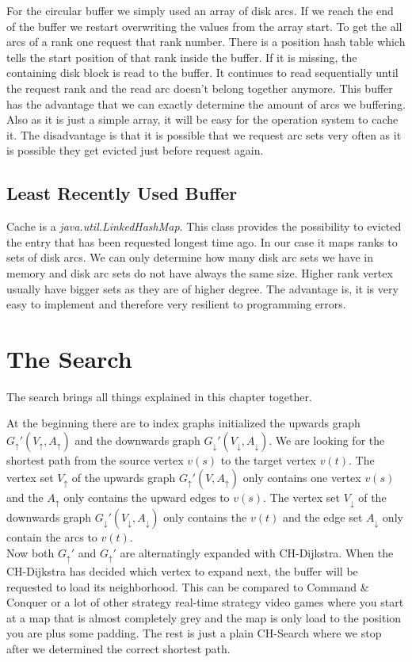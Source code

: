 For the circular buffer we simply used an array of disk arcs. If we reach the end of the buffer we restart overwriting the values from the array start. To get the all arcs of a rank one request that rank number. There is a position hash table which tells the start position of that rank inside the buffer. If it is missing, the containing disk block is read to the buffer. It 
continues to read sequentially until the request rank and the read arc doesn't belong together anymore. This buffer has the advantage that we can exactly determine the amount of arcs we buffering. Also as it is just a simple array, it will be easy for the operation system to cache it.
The disadvantage is that it is possible that we request arc sets very often as it is possible they get evicted just before request again.

\subsection{Least Recently Used Buffer}

Cache is a \textit{java.util.LinkedHashMap}. This class provides the possibility to evicted the entry that has been requested longest time ago. In our case it maps ranks to sets of disk arcs. We can only determine how many 
disk arc sets we have in memory and disk arc sets do not have always the same size. Higher rank vertex usually have bigger sets as they are of higher degree. The advantage is, it is very easy to implement and therefore very 
resilient to programming errors.

\section{The Search}

The search brings all things explained in this chapter together. 

At the beginning there are to index graphs initialized the upwards graph $G_\uparrow'(V_\uparrow, A_\uparrow)$ and the downwards graph $G_\downarrow'(V_\downarrow, A_\downarrow)$. We are looking for the shortest
path from the source vertex $v(s)$ to the target vertex $v(t)$. The vertex set $V_\uparrow$ of the upwards graph $G_\uparrow'(V, A_\uparrow)$ only contains one vertex $v(s)$ and the $A_\uparrow$ only contains 
the upward edges to $v(s)$. The vertex set $V_\downarrow$ of the downwards graph $G_\downarrow'(V_\downarrow, A_\downarrow)$ only contains the $v(t)$ and the edge set $A_\downarrow$ only contain the arcs to $v(t)$.
\\
Now both $G_\uparrow'$ and $G_\uparrow'$ are alternatingly expanded with CH-Dijkstra. When the CH-Dijkstra has decided which vertex to expand next, the buffer will be requested to load its neighborhood. This can be 
compared to Command \& Conquer or a lot of other strategy  real-time strategy video games where you start at a map that is almost completely grey and the map is only load to the position you are plus some padding.
The rest is just a plain CH-Search where we stop after we determined the correct shortest path.

%    
